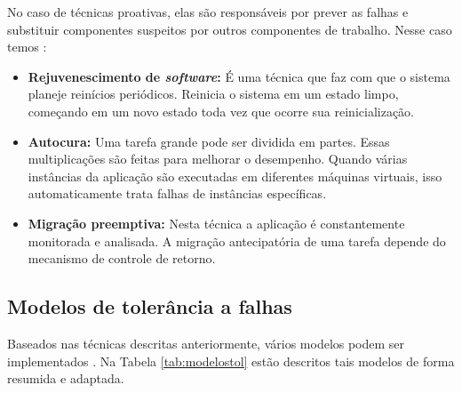 \documentclass[
	12pt,				%
	oneside,			%
	a4paper,			%
	chapter=TITLE,		%
	english,			%
	french,				%
	spanish,			%
	brazil				%
	]{abntex2}
\begin{document}
No caso de técnicas proativas, elas são responsáveis por prever as falhas e substituir componentes suspeitos por outros componentes de trabalho. Nesse caso temos \cite{bala2012fault, patra2013fault}:
\begin{itemize}
    \item \textbf{Rejuvenescimento de \emph{software}:} É uma técnica que faz com que o sistema planeje reinícios periódicos. Reinicia o sistema em um estado limpo, começando em um novo estado toda vez que ocorre sua reinicialização.
    \item \textbf{Autocura:} Uma tarefa grande pode ser dividida em partes. Essas multiplicações são feitas para melhorar o desempenho. Quando várias instâncias da aplicação são executadas em diferentes máquinas virtuais, isso automaticamente trata falhas de instâncias específicas.
    \item \textbf{Migração preemptiva:} Nesta técnica a aplicação é constantemente monitorada e analisada. A migração antecipatória de uma tarefa depende do mecanismo de controle de retorno.
\end{itemize}

\subsection{Modelos de tolerância a falhas}

Baseados nas técnicas descritas anteriormente, vários modelos podem ser implementados \cite{cheraghlou2016survey, patra2013fault}. Na Tabela \ref{tab:modelostol} estão descritos tais modelos de forma resumida e adaptada.
\end{document}
